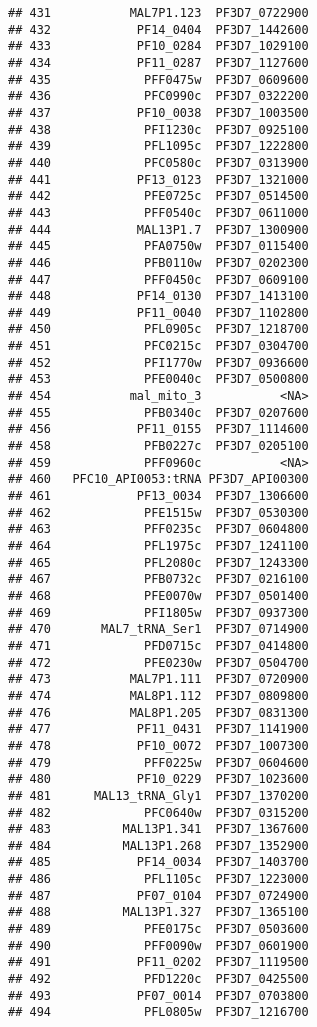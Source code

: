 \documentclass{article}\usepackage[]{graphicx}\usepackage[]{color}
\makeatletter
\newenvironment{kframe}{%
 \def\at@end@of@kframe{}%
 \ifinner\ifhmode%
  \def\at@end@of@kframe{\end{minipage}}%
  \begin{minipage}{\columnwidth}%
 \fi\fi%
 \def\FrameCommand##1{\hskip\@totalleftmargin \hskip-\fboxsep
 \colorbox{shadecolor}{##1}\hskip-\fboxsep
     \hskip-\linewidth \hskip-\@totalleftmargin \hskip\columnwidth}%
 \MakeFramed {\advance\hsize-\width
   \@totalleftmargin\z@ \linewidth\hsize
   \@setminipage}}%
 {\par\unskip\endMakeFramed%
 \at@end@of@kframe}
\newenvironment{knitrout}{}{} %
\makeatother
\begin{document}
\begin{knitrout}
\begin{kframe}
\begin{verbatim}
## 431           MAL7P1.123  PF3D7_0722900
## 432            PF14_0404  PF3D7_1442600
## 433            PF10_0284  PF3D7_1029100
## 434            PF11_0287  PF3D7_1127600
## 435             PFF0475w  PF3D7_0609600
## 436             PFC0990c  PF3D7_0322200
## 437            PF10_0038  PF3D7_1003500
## 438             PFI1230c  PF3D7_0925100
## 439             PFL1095c  PF3D7_1222800
## 440             PFC0580c  PF3D7_0313900
## 441            PF13_0123  PF3D7_1321000
## 442             PFE0725c  PF3D7_0514500
## 443             PFF0540c  PF3D7_0611000
## 444            MAL13P1.7  PF3D7_1300900
## 445             PFA0750w  PF3D7_0115400
## 446             PFB0110w  PF3D7_0202300
## 447             PFF0450c  PF3D7_0609100
## 448            PF14_0130  PF3D7_1413100
## 449            PF11_0040  PF3D7_1102800
## 450             PFL0905c  PF3D7_1218700
## 451             PFC0215c  PF3D7_0304700
## 452             PFI1770w  PF3D7_0936600
## 453             PFE0040c  PF3D7_0500800
## 454           mal_mito_3           <NA>
## 455             PFB0340c  PF3D7_0207600
## 456            PF11_0155  PF3D7_1114600
## 458             PFB0227c  PF3D7_0205100
## 459             PFF0960c           <NA>
## 460   PFC10_API0053:tRNA PF3D7_API00300
## 461            PF13_0034  PF3D7_1306600
## 462             PFE1515w  PF3D7_0530300
## 463             PFF0235c  PF3D7_0604800
## 464             PFL1975c  PF3D7_1241100
## 465             PFL2080c  PF3D7_1243300
## 467             PFB0732c  PF3D7_0216100
## 468             PFE0070w  PF3D7_0501400
## 469             PFI1805w  PF3D7_0937300
## 470       MAL7_tRNA_Ser1  PF3D7_0714900
## 471             PFD0715c  PF3D7_0414800
## 472             PFE0230w  PF3D7_0504700
## 473           MAL7P1.111  PF3D7_0720900
## 474           MAL8P1.112  PF3D7_0809800
## 476           MAL8P1.205  PF3D7_0831300
## 477            PF11_0431  PF3D7_1141900
## 478            PF10_0072  PF3D7_1007300
## 479             PFF0225w  PF3D7_0604600
## 480            PF10_0229  PF3D7_1023600
## 481      MAL13_tRNA_Gly1  PF3D7_1370200
## 482             PFC0640w  PF3D7_0315200
## 483          MAL13P1.341  PF3D7_1367600
## 484          MAL13P1.268  PF3D7_1352900
## 485            PF14_0034  PF3D7_1403700
## 486             PFL1105c  PF3D7_1223000
## 487            PF07_0104  PF3D7_0724900
## 488          MAL13P1.327  PF3D7_1365100
## 489             PFE0175c  PF3D7_0503600
## 490             PFF0090w  PF3D7_0601900
## 491            PF11_0202  PF3D7_1119500
## 492             PFD1220c  PF3D7_0425500
## 493            PF07_0014  PF3D7_0703800
## 494             PFL0805w  PF3D7_1216700

\end{verbatim}
\end{kframe}
\end{knitrout}
\end{document}
